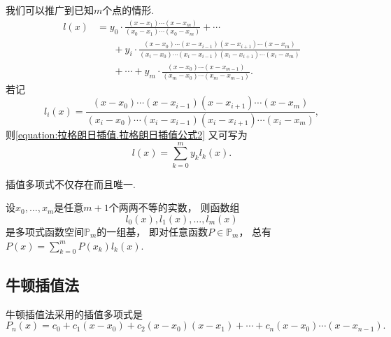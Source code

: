 我们可以推广到已知\(m\)个点的情形.
\begin{equation}\label{equation:拉格朗日插值.拉格朗日插值公式2}
	\begin{aligned}
		l(x)
		&= y_0 \cdot \frac{(x-x_1)\dotsm(x-x_m)}{(x_0-x_1)\dotsm(x_0-x_m)}
		+ \dotsb \\
		&\hspace{20pt}
		+ y_i \cdot \frac{(x-x_0)\dotsm(x-x_{i-1})(x-x_{i+1})\dotsm(x-x_m)}
		{(x_i-x_0)\dotsm(x_i-x_{i-1})(x_i-x_{i+1})\dotsm(x_i-x_m)} \\
		&\hspace{20pt}
		+ \dotsb
		+ y_m \cdot \frac{(x-x_0)\dotsm(x-x_{m-1})}{(x_m-x_0)\dotsm(x_m-x_{m-1})}.
	\end{aligned}
\end{equation}
若记\begin{equation}
	l_i(x) = \frac{(x-x_0)\dotsm(x-x_{i-1})(x-x_{i+1})\dotsm(x-x_m)}
	{(x_i-x_0)\dotsm(x_i-x_{i-1})(x_i-x_{i+1})\dotsm(x_i-x_m)},
\end{equation}
则\cref{equation:拉格朗日插值.拉格朗日插值公式2} 又可写为\begin{equation}
	l(x) = \sum_{k=0}^m y_k l_k(x).
\end{equation}

插值多项式不仅存在而且唯一.
\begin{theorem}
设\(x_0,\dotsc,x_m\)是任意\(m+1\)个两两不等的实数，
则函数组\[
	l_0(x), l_1(x), \dotsc, l_m(x)
\]是多项式函数空间\(\mathbb{P}_m\)的一组基，
即对任意函数\(P\in\mathbb{P}_m\)，
总有\(P(x) = \sum_{k=0}^m P(x_k) l_k(x)\).
\end{theorem}

\subsection{牛顿插值法}
牛顿插值法采用的插值多项式是\[
	P_n(x) = c_0 + c_1 (x-x_0) + c_2 (x-x_0)(x-x_1)
	+ \dotsb + c_n (x-x_0)\dotsm(x-x_{n-1}).
\]

